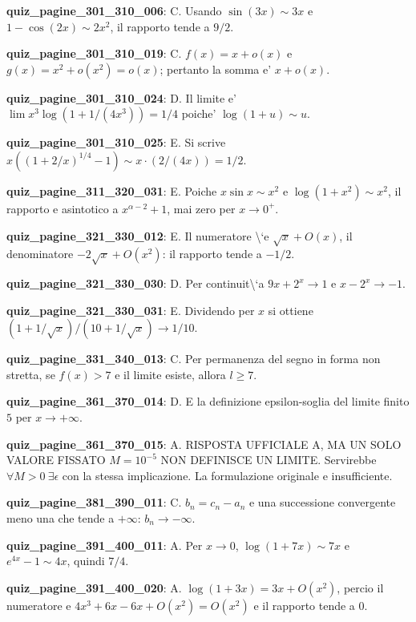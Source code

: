 \documentclass[11pt,a4paper]{article}
\newcounter{quiz}
\begin{document}
\noindent\textbf{quiz\_pagine\_301\_310\_006}: C. Usando $\sin(3x)\sim3x$ e $1-\cos(2x)\sim2x^2$, il rapporto tende a $9/2$.\par\medskip
\noindent\textbf{quiz\_pagine\_301\_310\_019}: C. $f(x)=x+o(x)$ e $g(x)=x^2+o(x^2)=o(x)$; pertanto la somma e' $x+o(x)$.\par\medskip
\noindent\textbf{quiz\_pagine\_301\_310\_024}: D. Il limite e' $\lim x^3\log(1+1/(4x^3))=1/4$ poiche' $\log(1+u)\sim u$.\par\medskip
\noindent\textbf{quiz\_pagine\_301\_310\_025}: E. Si scrive $x((1+2/x)^{1/4}-1)\sim x\cdot(2/(4x))=1/2$.\par\medskip
\noindent\textbf{quiz\_pagine\_311\_320\_031}: E. Poiche $x\sin x\sim x^2$ e $\log(1+x^2)\sim x^2$, il rapporto e asintotico a $x^{\alpha-2}+1$, mai zero per $x\to0^+$.\par\medskip
\noindent\textbf{quiz\_pagine\_321\_330\_012}: E. Il numeratore \textbackslash{}`e $\sqrt{x}+O(x)$, il denominatore $-2\sqrt{x}+O(x^2)$: il rapporto tende a $-1/2$.\par\medskip
\noindent\textbf{quiz\_pagine\_321\_330\_030}: D. Per continuit\textbackslash{}`a $9x+2^x\to1$ e $x-2^x\to-1$.\par\medskip
\noindent\textbf{quiz\_pagine\_321\_330\_031}: E. Dividendo per $x$ si ottiene $(1+1/\sqrt x)/(10+1/\sqrt x)\to1/10$.\par\medskip
\noindent\textbf{quiz\_pagine\_331\_340\_013}: C. Per permanenza del segno in forma non stretta, se $f(x)>7$ e il limite esiste, allora $l\geq7$.\par\medskip
\noindent\textbf{quiz\_pagine\_361\_370\_014}: D. E la definizione epsilon-soglia del limite finito $5$ per $x\to+\infty$.\par\medskip
\noindent\textbf{quiz\_pagine\_361\_370\_015}: A. RISPOSTA UFFICIALE A, MA UN SOLO VALORE FISSATO $M=10^{-5}$ NON DEFINISCE UN LIMITE. Servirebbe $\forall M>0\ \exists\epsilon$ con la stessa implicazione. La formulazione originale e insufficiente.\par\medskip
\noindent\textbf{quiz\_pagine\_381\_390\_011}: C. $b_n=c_n-a_n$ e una successione convergente meno una che tende a $+\infty$: $b_n\to-\infty$.\par\medskip
\noindent\textbf{quiz\_pagine\_391\_400\_011}: A. Per $x\to0$, $\log(1+7x)\sim7x$ e $e^{4x}-1\sim4x$, quindi $7/4$.\par\medskip
\noindent\textbf{quiz\_pagine\_391\_400\_020}: A. $\log(1+3x)=3x+O(x^2)$, percio il numeratore e $4x^3+6x-6x+O(x^2)=O(x^2)$ e il rapporto tende a $0$.\par\medskip
\end{document}
